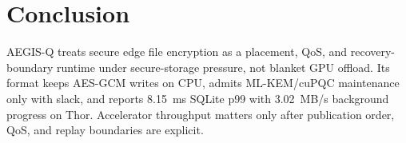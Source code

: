 \section{Conclusion}
\label{sec:conclusion}

AEGIS-Q treats secure edge file encryption as a placement, QoS, and recovery-boundary runtime under secure-storage pressure, not blanket GPU offload.  Its format keeps AES-GCM writes on CPU, admits ML-KEM/cuPQC maintenance only with slack, and reports 8.15~ms SQLite p99 with 3.02~MB/s background progress on Thor.  Accelerator throughput matters only after publication order, QoS, and replay boundaries are explicit.
